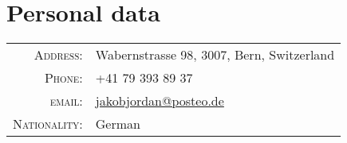 \section{Personal data}

\begin{longtable}{rl}
\textsc{Address:} & Wabernstrasse 98, 3007, Bern, Switzerland \\
\textsc{Phone:} & +41 79 393 89 37 \\
\textsc{email:} & \href{mailto:jakobjordan@posteo.de}{jakobjordan@posteo.de} \\
\textsc{Nationality:} & German
\end{longtable}

